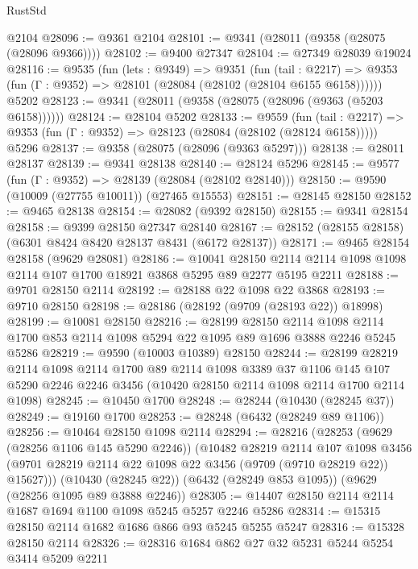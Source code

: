 \begin{lexlean}{RustStd}
\begin{coremodule}
    @2104
@28096 := @9361 @2104
@28101 := @9341 (@28011 (@9358 (@28075 (@28096 @9366))))
@28102 := @9400 @27347
@28104 := @27349 @28039 @19024
@28116 := @9535
    (fun (lets : @9349) =>
    @9351
      (fun (tail : @2217) =>
      @9353 (fun (Γ : @9352) => @28101 (@28084 (@28102 (@28104 @6155 @6158))))))
    @5202
@28123 := @9341 (@28011 (@9358 (@28075 (@28096 (@9363 (@5203 @6158))))))
@28124 := @28104 @5202
@28133 := @9559
    (fun (tail : @2217) => @9353 (fun (Γ : @9352) => @28123 (@28084 (@28102 (@28124 @6158)))))
    @5296
@28137 := @9358 (@28075 (@28096 (@9363 @5297)))
@28138 := @28011 @28137
@28139 := @9341 @28138
@28140 := @28124 @5296
@28145 := @9577 (fun (Γ : @9352) => @28139 (@28084 (@28102 @28140)))
@28150 := @9590 (@10009 (@27755 @10011)) (@27465 @15553)
@28151 := @28145 @28150
@28152 := @9465 @28138
@28154 := @28082 (@9392 @28150)
@28155 := @9341 @28154
@28158 := @9399 @28150 @27347 @28140
@28167 := @28152 (@28155 @28158) (@6301 @8424 @8420 @28137 @8431 (@6172 @28137))
@28171 := @9465 @28154 @28158 (@9629 @28081)
@28186 := @10041
    @28150
    @2114
    @2114
    @1098
    @1098
    @2114
    @107
    @1700
    @18921
    @3868
    @5295
    @89
    @2277
    @5195
    @2211
@28188 := @9701 @28150 @2114
@28192 := @28188 @22 @1098 @22 @3868
@28193 := @9710 @28150
@28198 := @28186 (@28192 (@9709 (@28193 @22)) @18998)
@28199 := @10081 @28150
@28216 := @28199
    @28150
    @2114
    @1098
    @2114
    @1700
    @853
    @2114
    @1098
    @5294
    @22
    @1095
    @89
    @1696
    @3888
    @2246
    @5245
    @5286
@28219 := @9590 (@10003 @10389) @28150
@28244 := @28199
    @28219
    @2114
    @1098
    @2114
    @1700
    @89
    @2114
    @1098
    @3389
    @37
    @1106
    @145
    @107
    @5290
    @2246
    @2246
    @3456
    (@10420 @28150 @2114 @1098 @2114 @1700 @2114 @1098)
@28245 := @10450 @1700
@28248 := @28244 (@10430 (@28245 @37))
@28249 := @19160 @1700
@28253 := @28248 (@6432 (@28249 @89 @1106))
@28256 := @10464 @28150 @1098 @2114
@28294 := @28216
    (@28253
      (@9629 (@28256 @1106 @145 @5290 @2246))
      (@10482
        @28219
        @2114
        @107
        @1098
        @3456
        (@9701 @28219 @2114 @22 @1098 @22 @3456 (@9709 (@9710 @28219 @22)) @15627)))
    (@10430 (@28245 @22))
    (@6432 (@28249 @853 @1095))
    (@9629 (@28256 @1095 @89 @3888 @2246))
@28305 := @14407 @28150 @2114 @2114 @1687 @1694 @1100 @1098 @5245 @5257 @2246 @5286
@28314 := @15315 @28150 @2114 @1682 @1686 @866 @93 @5245 @5255 @5247
@28316 := @15328 @28150 @2114
@28326 := @28316 @1684 @862 @27 @32 @5231 @5244 @5254 @3414 @5209 @2211

\end{coremodule}
\end{lexlean}
